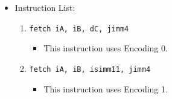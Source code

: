 \documentclass{article}
\begin{document}
\begin{itemize}
		\item Instruction List:
			\begin{enumerate}
			\item \texttt{fetch iA, iB, dC, jimm4}
				\begin{itemize}
				\item This instruction uses Encoding 0.
				\end{itemize}
			\item \texttt{fetch iA, iB, isimm11, jimm4}
				\begin{itemize}
				\item This instruction uses Encoding 1.
				\end{itemize}
			\end{enumerate}
		\end{itemize}
		\newpage
\end{document}
